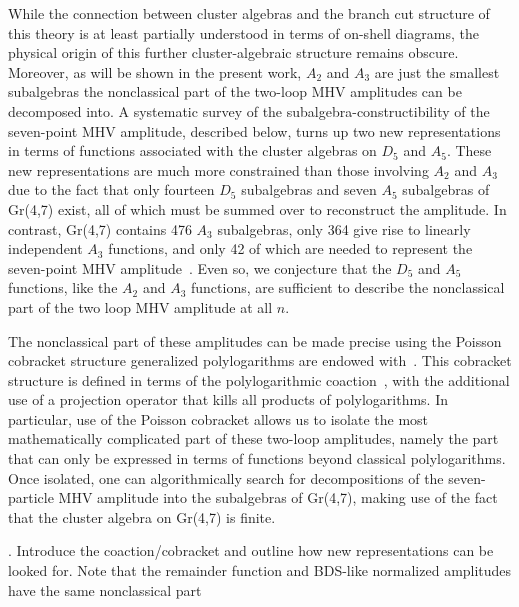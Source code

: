 \documentclass[11pt]{article}
\begin{document}
While the connection between cluster algebras and the branch cut structure of this theory is at least partially understood in terms of on-shell diagrams, the physical origin of this further cluster-algebraic structure remains obscure. Moreover, as will be shown in the present work, $A_2$ and $A_3$ are just the smallest subalgebras the nonclassical part of the two-loop MHV amplitudes can be decomposed into. A systematic survey of the subalgebra-constructibility of the seven-point MHV amplitude, described below, turns up two new representations in terms of functions associated with the cluster algebras on $D_5$ and $A_5$. These new representations are much more constrained than those involving $A_2$ and $A_3$ due to the fact that only fourteen $D_5$ subalgebras and seven $A_5$ subalgebras of Gr(4,7) exist, all of which must be summed over to reconstruct the amplitude. In contrast, Gr(4,7) contains 476 $A_3$ subalgebras, only 364 give rise to linearly independent $A_3$ functions, and only 42 of which are needed to represent the seven-point MHV amplitude~\cite{Golden:2014xqa}.  Even so, we conjecture that the $D_5$ and $A_5$ functions, like the $A_2$ and $A_3$ functions, are sufficient to describe the nonclassical part of the two loop MHV amplitude at all $n$.

The nonclassical part of these amplitudes can be made precise using the Poisson cobracket structure generalized polylogarithms are endowed with~\cite{}. This cobracket structure is defined in terms of the polylogarithmic coaction~\cite{}, with the additional use of a projection operator that kills all products of polylogarithms. In particular, use of the Poisson cobracket allows us to isolate the most mathematically complicated part of these two-loop amplitudes, namely the part that can only be expressed in terms of functions beyond classical polylogarithms. Once isolated, one can algorithmically search for decompositions of the seven-particle MHV amplitude into the subalgebras of Gr(4,7), making use of the fact that the cluster algebra on Gr(4,7) is finite.

\vspace{2cm}

. Introduce the coaction/cobracket and outline how new representations can be looked for. Note that the remainder function and BDS-like normalized amplitudes have the same nonclassical part
\end{document}
